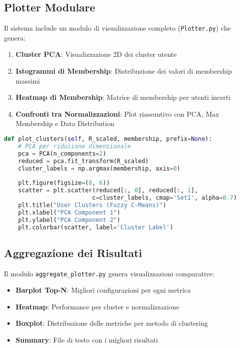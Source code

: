 \subsection{Plotter Modulare}

Il sistema include un modulo di visualizzazione completo (\texttt{Plotter.py}) che genera:

\begin{enumerate}
    \item \textbf{Cluster PCA}: Visualizzazione 2D dei cluster utente
    \item \textbf{Istogrammi di Membership}: Distribuzione dei valori di membership massimi
    \item \textbf{Heatmap di Membership}: Matrice di membership per utenti incerti
    \item \textbf{Confronti tra Normalizzazioni}: Plot riassuntivo con PCA, Max Membership e Data Distribution
\end{enumerate}

\begin{lstlisting}[language=Python, caption=Esempio di visualizzazione cluster]
def plot_clusters(self, R_scaled, membership, prefix=None):
    # PCA per riduzione dimensionale
    pca = PCA(n_components=2)
    reduced = pca.fit_transform(R_scaled)
    cluster_labels = np.argmax(membership, axis=0)
    
    plt.figure(figsize=(8, 6))
    scatter = plt.scatter(reduced[:, 0], reduced[:, 1], 
                         c=cluster_labels, cmap='Set1', alpha=0.7)
    plt.title("User Clusters (Fuzzy C-Means)")
    plt.xlabel("PCA Component 1")
    plt.ylabel("PCA Component 2")
    plt.colorbar(scatter, label='Cluster Label')
\end{lstlisting}

\subsection{Aggregazione dei Risultati}

Il modulo \texttt{aggregate\_plotter.py} genera visualizzazioni comparative:

\begin{itemize}
    \item \textbf{Barplot Top-N}: Migliori configurazioni per ogni metrica
    \item \textbf{Heatmap}: Performance per cluster e normalizzazione
    \item \textbf{Boxplot}: Distribuzione delle metriche per metodo di clustering
    \item \textbf{Summary}: File di testo con i migliori risultati
\end{itemize}

